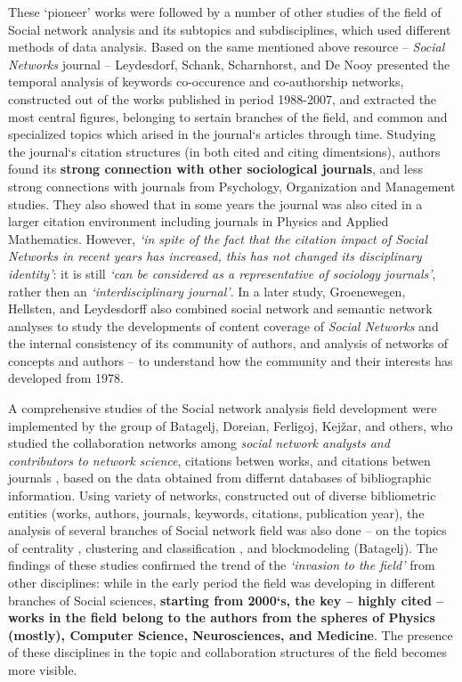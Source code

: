 \documentclass[11pt]{article} %
\begin{document}
These `pioneer' works were followed by a number of other studies of the field of Social network analysis and its subtopics and subdisciplines, which used different methods of data analysis. Based on the same mentioned above resource -- \textit{Social Networks} journal -- Leydesdorf, Schank, Scharnhorst, and De Nooy \citep{leydes} presented the temporal analysis of keywords co-occurence and co-authorship networks, constructed out of the works published in period 1988-2007, and extracted the most central figures, belonging to sertain branches of the field, and common and specialized topics which arised in the journal`s articles through time. Studying the journal`s citation structures (in both cited and citing dimentsions),  authors found its \textbf{strong connection with other sociological journals}, and less strong connections with journals from Psychology, Organization and Management studies. They also showed that in some years the journal was also cited in a larger citation environment including journals in Physics and Applied Mathematics. However, \textit{`in spite of the fact that the citation impact of Social Networks in recent years has increased, this has not changed its disciplinary identity'}: it is still \textit{`can be considered as a representative of sociology journals'}, rather then an \textit{`interdisciplinary journal'}. In a later study,  Groenewegen, Hellsten, and Leydesdorff \citep{lookingglass} also combined social network and semantic network analyses to study the developments of content coverage of \textit{Social Networks} and the internal consistency of its community of authors, and analysis of networks of concepts and authors -- to understand how the community and their interests has developed from 1978.   \medskip 

A comprehensive studies of the Social network analysis field development were implemented by the group of Batagelj, Doreian, Ferligoj, Kejžar, and others, who studied the collaboration networks among \textit{social network analysts and contributors to network science}, citations betwen works, and citations betwen journals \citep{Understand}, based on the data obtained from differnt databases of bibliographic information. Using variety of networks, constructed out of diverse bibliometric entities (works, authors, journals, keywords, citations, publication year), the analysis of several branches of Social network field was also done -- on the topics of centrality \citep{Understand}, clustering and classification \citep{kejzar}, and blockmodeling (Batagelj). The findings of these studies confirmed the trend of the \textit{`invasion to the field'} from other disciplines: while in the early period the field was developing in different branches of Social sciences, \textbf{starting from 2000`s, the key -- highly cited -- works in the field belong to the authors from the spheres of Physics (mostly), Computer Science, Neurosciences, and Medicine}. The presence of these disciplines in the topic and collaboration structures of the field becomes more visible. \medskip  
\end{document}
